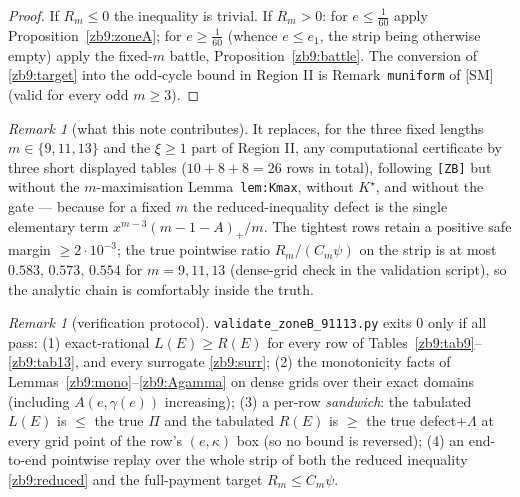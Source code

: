 \documentclass[11pt]{article}
\theoremstyle{remark}
\newtheorem{remark}[lemma]{Remark}
\newcommand{\SM}{[SM]}
\begin{document}
\begin{proof}
If $R_m\le0$ the inequality is trivial.  If $R_m>0$: for $e\le\tfrac1{60}$
apply Proposition~\ref{zb9:zoneA}; for $e\ge\tfrac1{60}$ (whence
$e\le e_1$, the strip being otherwise empty) apply the fixed-$m$ battle,
Proposition~\ref{zb9:battle}.  The conversion of \eqref{zb9:target} into the
odd-cycle bound in Region II is Remark~\texttt{muniform} of \SM{} (valid for
every odd $m\ge3$).
\end{proof}

\begin{remark}[what this note contributes]\label{zb9:rmk:final}
It replaces, for the three fixed lengths $m\in\{9,11,13\}$ and the
$\xi\ge1$ part of Region II, any computational certificate by three short
displayed tables ($10+8+8=26$ rows in total), following \texttt{[ZB]} but
without the $m$-maximisation Lemma~\texttt{lem:Kmax}, without $K^\star$, and
without the gate --- because for a fixed $m$ the reduced-inequality defect is
the single elementary term $x^{m-3}(m-1-A)_+/m$.  The tightest rows retain a
positive safe margin $\ge2\cdot10^{-3}$; the true pointwise ratio
$R_m/(C_m\psi)$ on the strip is at most $0.583,\,0.573,\,0.554$ for
$m=9,11,13$ (dense-grid check in the validation script), so the analytic
chain is comfortably inside the truth.
\end{remark}

\begin{remark}[verification protocol]\label{zb9:rmk:proto}
\texttt{validate\_zoneB\_91113.py} exits $0$ only if all pass:
(1) exact-rational $L(E)\ge R(E)$ for every row of
Tables~\ref{zb9:tab9}--\ref{zb9:tab13}, and every surrogate
\eqref{zb9:surr};
(2) the monotonicity facts of Lemmas~\ref{zb9:mono}--\ref{zb9:Agamma} on dense
grids over their exact domains (including $A(e,\gamma(e))$ increasing);
(3) a per-row \emph{sandwich}: the tabulated $L(E)$ is $\le$ the true
$\Pi$ and the tabulated $R(E)$ is $\ge$ the true defect$+\Lambda$ at every
grid point of the row's $(e,\kappa)$ box (so no bound is reversed);
(4) an end-to-end pointwise replay over the whole strip of both the reduced
inequality \eqref{zb9:reduced} and the full-payment target
$R_m\le C_m\psi$.
\end{remark}
\end{document}
